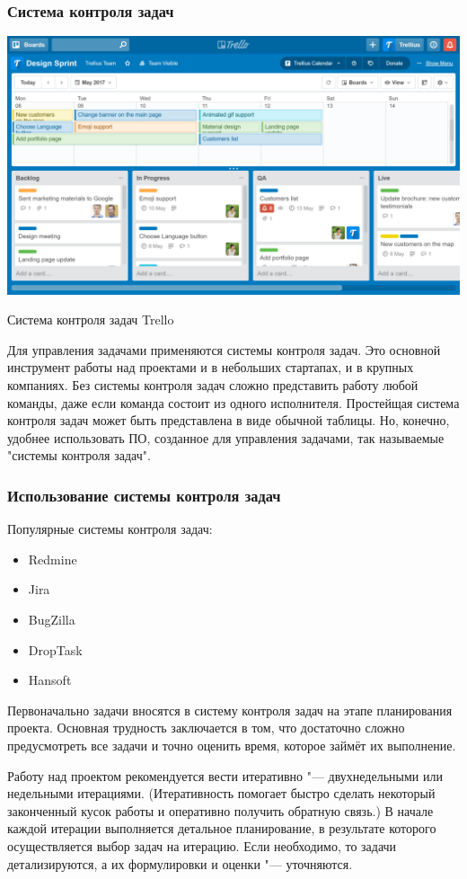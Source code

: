 \documentclass{../industrial-development}
\begin{document}
\begin{frame} \frametitle{Система контроля задач}
	\centerline{\includegraphics[width=1\textwidth]{trello.png}}
	\centerline{Система контроля задач Trello}
\end{frame}
\lecturenotes

Для управления задачами применяются системы контроля задач. Это основной инструмент работы над проектами и в небольших стартапах, и в крупных компаниях. Без системы контроля задач сложно представить работу любой команды, даже если команда состоит из одного исполнителя. Простейщая система контроля задач может быть представлена в виде обычной таблицы. Но, конечно, удобнее использовать ПО, созданное для управления задачами, так называемые "системы контроля задач".

\begin{frame} \frametitle{Использование системы контроля задач}
	Популярные системы контроля задач:
	\begin{itemize}
		\item Redmine
		\item Jira
		\item BugZilla
		\item DropTask
		\item Hansoft
	\end{itemize}
\end{frame}
\lecturenotes

Первоначально задачи вносятся в систему контроля задач на этапе планирования проекта. Основная трудность заключается в том, что достаточно сложно предусмотреть все задачи и точно оценить время, которое займёт их выполнение.

Работу над проектом рекомендуется вести итеративно "--- двухнедельными или недельными итерациями. (Итеративность помогает быстро сделать некоторый законченный кусок работы и оперативно получить обратную связь.) В начале каждой итерации выполняется детальное планирование, в результате которого осуществляется выбор задач на итерацию. Если необходимо, то задачи детализируются, а их формулировки и оценки "--- уточняются.
\end{document}
